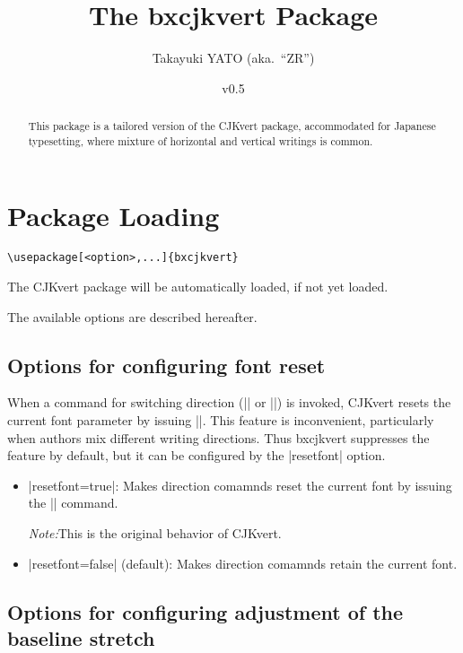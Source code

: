 \documentclass[a4paper]{article}
\newcommand{\PkgVersion}{0.5}
\newcommand{\PkgDate}{2023/07/23}
\newcommand{\Pkg}[1]{\textsf{#1}}
\newcommand{\Note}{\par\noindent \emph{Note:}\quad}
\newcommand{\Means}{:\hspace{1em plus 1em}}
\begin{document}
\title{The \Pkg{bxcjkvert} Package}
\author{Takayuki YATO (aka.~``ZR'')}
\date{v\PkgVersion\quad[\PkgDate]}
\maketitle

\begin{abstract}
This package is a tailored version of the \Pkg{CJKvert} package,
accommodated for Japanese typesetting,
where mixture of horizontal and vertical writings is common.
\end{abstract}

\tableofcontents

\section{Package Loading}
\label{sec:loading}

\begin{verbatim}
\usepackage[<option>,...]{bxcjkvert}
\end{verbatim}

The \Pkg{CJKvert} package will be automatically loaded,
if not yet loaded.

The available options are described hereafter.

\subsection{Options for configuring font reset}

When a command for switching direction (|\CJKhorz| or |\CJKvert|)
is invoked, \Pkg{CJKvert} resets the current font parameter
by issuing |\normalfont|.
This feature is inconvenient, particularly
when authors mix different writing directions.
Thus \Pkg{bxcjkvert} suppresses the feature by default,
but it can be configured by the |resetfont| option.

\begin{itemize}
\item |resetfont=true|\Means
  Makes direction comamnds reset the current font by issuing
  the |\normalfont| command.
  \Note This is the original behavior of \Pkg{CJKvert}.
\item |resetfont=false| (default)\Means
  Makes direction comamnds retain the current font.
\end{itemize}

\subsection{Options for configuring adjustment of the baseline stretch}
\end{document}
